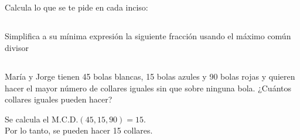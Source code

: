 \documentclass[12pt,addpoints]{evalua}
\begin{document}
\begin{questions}
    \subsection*{\else{}\fi}
    \question[4] Calcula lo que se te pide en cada inciso:

    \subsection*{\else{}\fi}
    \question[4] Simplifica a su mínima expresión la siguiente fracción usando el máximo común divisor
    \begin{multicols}{2}
    \end{multicols}

    \subsection*{\else{}\fi}

    \question[6] María y Jorge tienen 45 bolas blancas, 15 bolas azules y 90 bolas rojas y quieren hacer el mayor número de collares iguales sin que sobre ninguna bola. ¿Cuántos collares iguales pueden hacer?
    \begin{solutionbox}{4cm}
        Se calcula el M.C.D.$(45,15,90) = 15$.\\
        Por lo tanto, se pueden hacer 15 collares.
    \end{solutionbox}
    \newpage

\end{questions}
\end{document}
